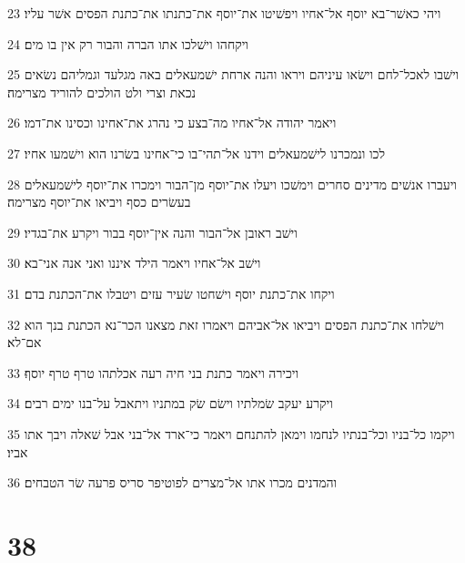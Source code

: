 \par 23 ויהי כאשׁר־בא יוסף אל־אחיו ויפשׁיטו את־יוסף את־כתנתו את־כתנת הפסים אשׁר עליו׃
\par 24 ויקחהו וישׁלכו אתו הברה והבור רק אין בו מים׃
\par 25 וישׁבו לאכל־לחם וישׂאו עיניהם ויראו והנה ארחת ישׁמעאלים באה מגלעד וגמליהם נשׂאים נכאת וצרי ולט הולכים להוריד מצרימה׃
\par 26 ויאמר יהודה אל־אחיו מה־בצע כי נהרג את־אחינו וכסינו את־דמו׃
\par 27 לכו ונמכרנו לישׁמעאלים וידנו אל־תהי־בו כי־אחינו בשׂרנו הוא וישׁמעו אחיו׃
\par 28 ויעברו אנשׁים מדינים סחרים וימשׁכו ויעלו את־יוסף מן־הבור וימכרו את־יוסף לישׁמעאלים בעשׂרים כסף ויביאו את־יוסף מצרימה׃
\par 29 וישׁב ראובן אל־הבור והנה אין־יוסף בבור ויקרע את־בגדיו׃
\par 30 וישׁב אל־אחיו ויאמר הילד איננו ואני אנה אני־בא׃
\par 31 ויקחו את־כתנת יוסף וישׁחטו שׂעיר עזים ויטבלו את־הכתנת בדם׃
\par 32 וישׁלחו את־כתנת הפסים ויביאו אל־אביהם ויאמרו זאת מצאנו הכר־נא הכתנת בנך הוא אם־לא׃
\par 33 ויכירה ויאמר כתנת בני חיה רעה אכלתהו טרף טרף יוסף׃
\par 34 ויקרע יעקב שׂמלתיו וישׂם שׂק במתניו ויתאבל על־בנו ימים רבים׃
\par 35 ויקמו כל־בניו וכל־בנתיו לנחמו וימאן להתנחם ויאמר כי־ארד אל־בני אבל שׁאלה ויבך אתו אביו׃
\par 36 והמדנים מכרו אתו אל־מצרים לפוטיפר סריס פרעה שׂר הטבחים׃

\chapter{38}

